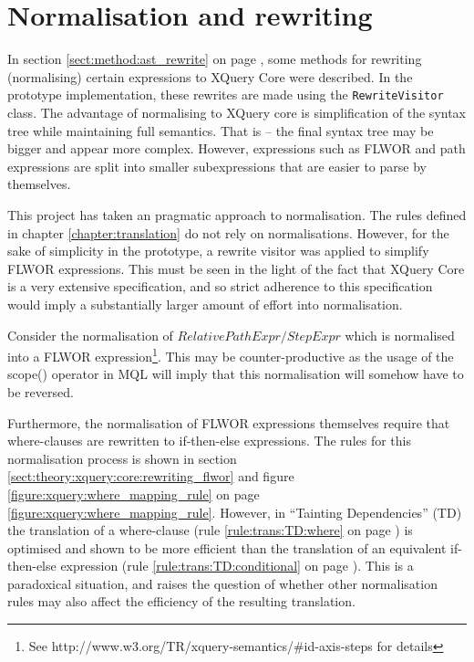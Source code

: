 \section{Normalisation and rewriting}
\label{sect:disc:rewriting}
In section \ref{sect:method:ast_rewrite} on page
\pageref{sect:method:ast_rewrite}, some methods for rewriting (normalising)
certain expressions to XQuery Core were described. In the prototype implementation,
these rewrites are made using the \texttt{RewriteVisitor} class. The advantage
of normalising to XQuery core is simplification of the syntax tree while
maintaining full semantics. That is -- the final syntax tree may be bigger and
appear more complex. However, expressions such as FLWOR and path expressions
are split into smaller subexpressions that are easier to parse by themselves. 

This project has taken an pragmatic approach to normalisation. The rules
defined in chapter \ref{chapter:translation} do not rely on normalisations.
However, for the sake of simplicity in the prototype, a rewrite visitor was 
applied to simplify FLWOR expressions. This must be seen in the light of the
fact that XQuery Core is a very extensive specification\cite{xquery_semantics},
and so strict adherence to this specification would imply a substantially
larger amount of effort into normalisation.

Consider the normalisation of $RelativePathExpr/StepExpr$ which is normalised
into a FLWOR expression\footnote{See
http://www.w3.org/TR/xquery-semantics/\#id-axis-steps for details}. This may be
counter-productive as the usage of the \textsf{scope()} operator in MQL will
imply that this normalisation will somehow have to be reversed.

Furthermore, the normalisation of FLWOR expressions themselves require that
where-clauses are rewritten to if-then-else expressions. The rules for this
normalisation process is shown in section
\ref{sect:theory:xquery:core:rewriting_flwor} and figure
\ref{figure:xquery:where_mapping_rule} on page 
\ref{figure:xquery:where_mapping_rule}. However, in ``Tainting Dependencies''
(TD) the translation of a where-clause (rule \ref{rule:trans:TD:where} on page
\pageref{rule:trans:TD:where}) is optimised and shown to be more efficient than
the translation of an equivalent if-then-else expression (rule
\ref{rule:trans:TD:conditional} on page \pageref{rule:trans:TD:conditional}).
This is a paradoxical situation, and raises the question of whether other
normalisation rules may also affect the efficiency of the resulting
translation.

